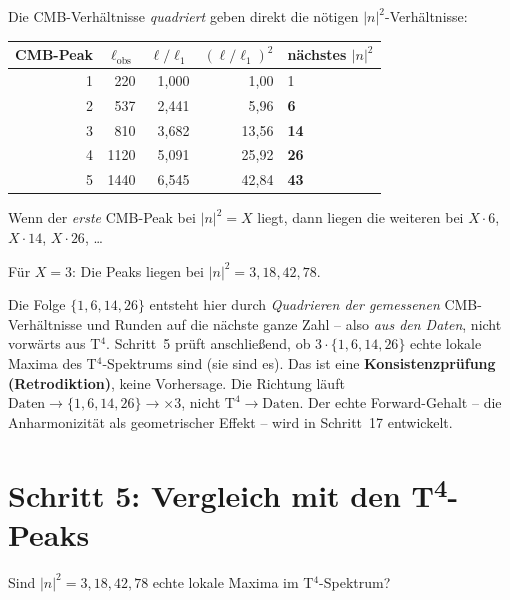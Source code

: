 Die CMB-Verhältnisse \emph{quadriert} geben direkt die nötigen
$|n|^2$-Verhältnisse:

\begin{center}
\begin{tabular}{rrrrl}
\toprule
CMB-Peak & $\ell_\mathrm{obs}$ & $\ell/\ell_1$ & $(\ell/\ell_1)^2$ & nächstes $|n|^2$ \\
\midrule
1 & 220  & 1{,}000 & 1{,}00  & 1 \\
2 & 537  & 2{,}441 & 5{,}96  & \textbf{6} \\
3 & 810  & 3{,}682 & 13{,}56 & \textbf{14} \\
4 & 1120 & 5{,}091 & 25{,}92 & \textbf{26} \\
5 & 1440 & 6{,}545 & 42{,}84 & \textbf{43} \\
\bottomrule
\end{tabular}
\end{center}

Wenn der \emph{erste} CMB-Peak bei $|n|^2 = X$ liegt, dann
liegen die weiteren bei $X \cdot 6$, $X \cdot 14$, $X \cdot 26$, \ldots

Für $X = 3$: Die Peaks liegen bei $|n|^2 = 3, 18, 42, 78$.

\begin{tcolorbox}[colback=red!4!white, colframe=red!55!black,
  title={Ehrliche Einordnung von Schritt~4 (Richtung der Schlussfolgerung)}]
Die Folge $\{1,6,14,26\}$ entsteht hier durch \emph{Quadrieren der
gemessenen} CMB-Verhältnisse und Runden auf die nächste ganze Zahl --
also \emph{aus den Daten}, nicht vorwärts aus T$^4$. Schritt~5 prüft
anschließend, ob $3\cdot\{1,6,14,26\}$ echte lokale Maxima des
T$^4$-Spektrums sind (sie sind es). Das ist eine \textbf{Konsistenzprüfung
(Retrodiktion)}, keine Vorhersage. Die Richtung läuft
$\text{Daten}\to\{1,6,14,26\}\to{\times3}$, nicht $\text{T}^4\to\text{Daten}$.
Der echte Forward-Gehalt -- die Anharmonizität als geometrischer Effekt --
wird in Schritt~17 entwickelt.
\end{tcolorbox}

\section{Schritt 5: Vergleich mit den T\textsuperscript{4}-Peaks}

Sind $|n|^2 = 3, 18, 42, 78$ echte lokale Maxima im T$^4$-Spektrum?

